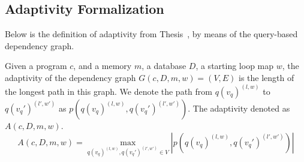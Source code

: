 \subsection*{Adaptivity Formalization}
Below is the definition of adaptivity from Thesis~\cite{weihao22}, by means of the query-based dependency graph. 
\begin{defn}
Given a program $c$, and a memory $m$, a database $D$, a starting loop map $w$, the adaptivity of the dependency graph $G(c, D,m,w) = (V, E)$ is the length of the longest path in this graph. We denote the path from $q({v_q})^{(l,w)}$ to $q({v_q}')^{(l',w')}$ as $p(q({v_q})^{(l,w)}, q({v_q}')^{(l',w')} )$. The adaptivity denoted as $A(c, D, m, w)$.
%
$$A(c, D, m, w) = \max\limits_{q({v_q})^{(l,w)},q({v_q}')^{(l',w')} \in V } |p(q({v_q})^{(l,w)}, q({v_q}')^{(l',w')} )| $$
\end{defn}
